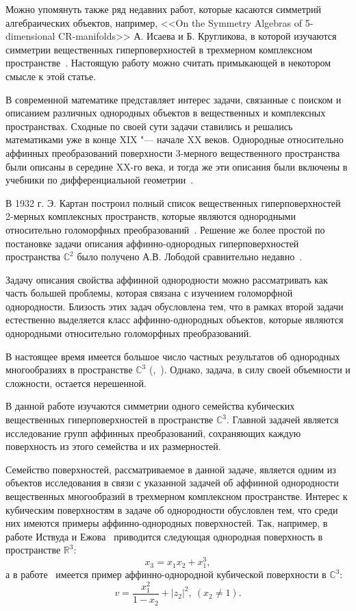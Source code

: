 \documentclass[../main.tex]{subfiles}
\begin{document}
Можно упомянуть также ряд недавних работ, которые касаются симметрий алгебраических объектов, например, <<On the Symmetry Algebras of 5-dimensional CR-manifolds>> А. Исаева и Б. Кругликова, в которой изучаются симметрии вещественных гиперповерхностей в трехмерном комплексном пространстве~\cite{IK}. Настоящую работу можно считать примыкающей в некотором смысле к этой статье.

В современной математике представляет интерес задачи, связанные с поиском и описанием различных однородных объектов в вещественных и комплексных пространствах. Сходные по своей сути задачи ставились и решались математиками уже в конце XIX "--- начале XX веков. Однородные относительно аффинных преобразований поверхности 3-мерного вещественного пространства были описаны в середине XX-го века, и тогда же эти описания были включены в учебники по дифференциальной геометрии~\cite{shirokov}.

В 1932 г. Э. Картан построил полный список вещественных гиперповерхностей 2-мерных комплексных пространств, которые являются однородными относительно голоморфных преобразований~\cite{cartan}. Решение же более простой по постановке задачи описания аффинно-однородных гиперповерхностей пространства $\mathbb{C}^2$ было получено А.В. Лободой сравнительно недавно~\cite{loboda_book}.

Задачу описания свойства аффинной однородности можно рассматривать как часть большей проблемы, которая связана с изучением голоморфной однородности. Близость этих задач обусловлена тем, что в рамках второй задачи естественно выделяется класс аффинно-однородных объектов, которые являются однородными относительно голоморфных преобразований.

В настоящее время имеется большое число частных результатов об однородных многообразиях в пространстве $\mathbb{C}^3$ (\cite{ALS},~\cite{loboda_hodarev}). Однако, задача, в силу своей объемности и сложности, остается нерешенной.


В данной работе изучаются симметрии одного семейства кубических вещественных гиперповерхностей в пространстве $\mathbb{C}^3$. Главной задачей является исследование групп аффинных преобразований, сохраняющих каждую поверхность из этого семейства и их размерностей.

Семейство поверхностей, рассматриваемое в данной задаче, является одним из объектов исследования в связи с указанной задачей об аффинной однородности вещественных многообразий в трехмерном комплексном пространстве. Интерес к кубическим поверхностям в задаче об однородности обусловлен тем, что среди них имеются примеры аффинно-однородных поверхностей. Так, например, в работе Иствуда и Ежова~\cite{eastwood} приводится следующая однородная поверхность в пространстве $\mathbb{R}^3$:
$$
x_3 = x_1 x_2 + x_1^3,
$$
а в работе~\cite{ALS} имеется пример аффинно-однородной кубической поверхности в $\mathbb{C}^3$:
$$
v = \frac{x_1^2}{1 - x_2} + |z_2|^2,\ (x_2 \ne 1).
$$
\end{document}
